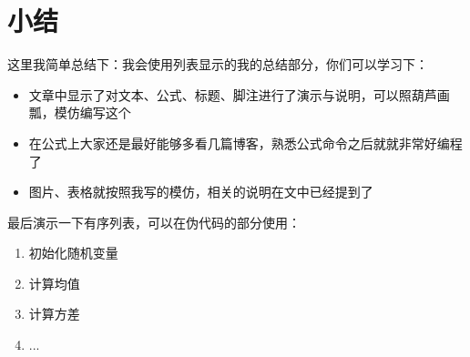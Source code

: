 \documentclass[../document.tex]{subfiles}
\begin{document}
\section{小结}
	
这里我简单总结下：我会使用列表显示的我的总结部分，你们可以学习下：
\begin{itemize}
		\item 文章中显示了对文本、公式、标题、脚注进行了演示与说明，可以照葫芦画瓢，模仿编写这个
		\item 在公式上大家还是最好能够多看几篇博客，熟悉公式命令之后就就非常好编程了
		\item 图片、表格就按照我写的模仿，相关的说明在文中已经提到了
\end{itemize}

最后演示一下有序列表，可以在伪代码的部分使用：

\begin{enumerate}
	\item 初始化随机变量
	\item 计算均值
	\item 计算方差
	\item ...
\end{enumerate}
	
\end{document}
